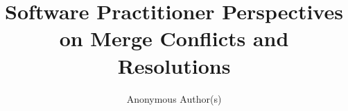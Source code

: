 \documentclass[conference]{IEEEtran}
\begin{document}
\title{Software Practitioner Perspectives on Merge Conflicts and Resolutions}

\author{Anonymous Author(s)}

\maketitle
\thispagestyle{plain}
\pagestyle{plain}

\IEEEpeerreviewmaketitle







%


{}
\end{document}
